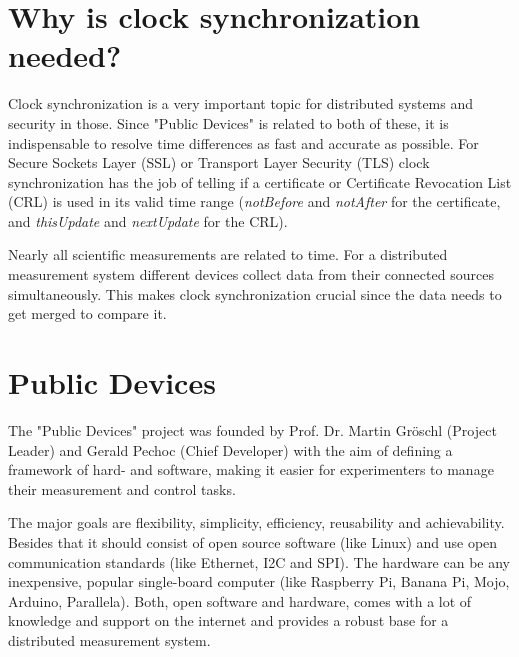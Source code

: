 
\section{Why is clock synchronization needed?}

Clock synchronization is a very important topic for distributed systems and security in those. Since "Public Devices" is related to both of these, it is indispensable to resolve time differences as fast and accurate as possible. For Secure Sockets Layer (SSL) or Transport Layer Security (TLS) clock synchronization has the job of telling if a certificate or Certificate Revocation List (CRL) is used in its valid time range (\textit{notBefore} and \textit{notAfter} for the certificate, and \textit{thisUpdate} and \textit{nextUpdate} for the CRL).


Nearly all scientific measurements are related to time. For a distributed measurement system different devices collect data from their connected sources simultaneously. This makes clock synchronization crucial since the data needs to get merged to compare it.

\section{Public Devices}

The "Public Devices" project was founded by Prof. Dr. Martin Gröschl (Project Leader) and Gerald Pechoc (Chief Developer) with the aim of defining a framework of hard- and software, making it easier for experimenters to manage their measurement and control tasks.

The major goals are flexibility, simplicity, efficiency, reusability and achievability. Besides that it should consist of open source software (like Linux) and use open communication standards (like Ethernet, I2C and SPI). The hardware can be any inexpensive, popular single-board computer (like Raspberry Pi, Banana Pi, Mojo, Arduino, Parallela). Both, open software and hardware, comes with a lot of knowledge and support on the internet and provides a robust base for a distributed measurement system.

